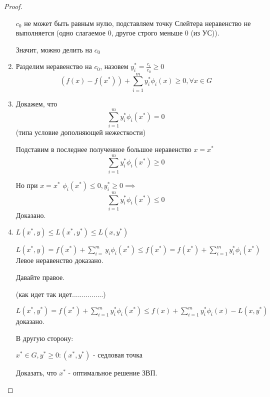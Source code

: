 \documentclass[a4paper]{article}
\theoremstyle{definition}
\theoremstyle{remark}
\begin{document}
\begin{proof}
\begin{enumerate}
        $c_0$ не может быть равным нулю, подставляем точку Слейтера неравенство не выполняется (одно слагаемое 0, другое строго меньше 0 (из УС)).

        Значит, можно делить на $c_0$
        \item Разделим неравенство на $c_0$, назовем $y_i^* = \frac{c_i}{c_0}\ge 0$
        \[(f(x) - f(x^*)) + \sum_{i = 1}^m y_i^* \phi_i(x)\ge 0, \forall x\in G\]
        \item Докажем, что 
        \[\sum_{i = 1}^m y_i^* \phi_i(x^*) = 0\]
        (типа условие дополняющей нежесткости)

        Подставим в последнее полученное большое неравенство $x = x^*$
        \[\sum_{i = 1}^m y_i^* \phi_i(x^*)\ge 0\]

        Но при $x = x^*$ $\phi_i(x^*)\le 0, y_i^*\ge 0\implies$
        \[ \sum_{i = 1}^m y_i^* \phi_i(x^*)\le 0\]
        Доказано.
        \item $L(x^*, y)\le L(x^*, y^*)\le L(x, y^*)$

        $L(x^*, y) = f(x^*) +\sum_{i = }^{m} y_i \phi_i(x^*)\le f(x^*) = f(x^*) + \sum_{i = 1}^m y_i^* \phi_i(x^*)$ Левое неравенство доказано.

        Давайте правое.

        (как идет так идет................)

        $L(x^*, y^*) = f(x^*) +\sum_{i = 1}^{m}y_i^* \phi_i(x^*)\le f(x) +\sum_{i =1 }^{m} y_i^* \phi_i(x) - L(x, y^*)$
        доказано.

        В другую сторону:

        $x^* \in G, y^* \ge 0: (x^*, y^*)$ - седловая точка

        Доказать, что $x^*$ - оптимальное решение ЗВП.
    \end{enumerate}
\end{proof}
\end{document}
